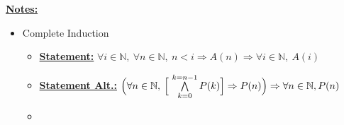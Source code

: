 \documentclass[12pt]{article}
\begin{document}
\begin{itemize}














    \bigskip

    \underline{\textbf{Notes:}}

    \bigskip

    \begin{itemize}
        \item Complete Induction
        \begin{itemize}
            \item \underline{\textbf{Statement:}} $\forall i \in \mathbb{N},\:\forall n \in \mathbb{N},\:n < i \Rightarrow A(n) \Rightarrow \forall i \in \mathbb{N},\:A(i)$
            \item \underline{\textbf{Statement Alt.:}} $\Bigl(\forall n \in \mathbb{N},\:\Bigl[ \ \bigwedge\limits_{k = 0}^{k=n-1} P(k) \Bigr] \Rightarrow P(n) \Bigr) \Rightarrow \forall n \in \mathbb{N}, P(n)$
            \item


\end{itemize}
\end{itemize}
\end{itemize}
\end{document}

